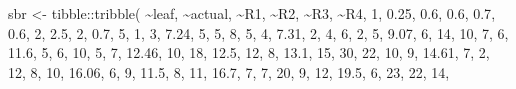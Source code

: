 \documentclass[
  letterpaper,
  DIV=11,
  numbers=noendperiod]{scrreprt}
\newenvironment{Shaded}{\begin{snugshade}}{\end{snugshade}}
\newcommand{\DecValTok}[1]{\textcolor[rgb]{0.68,0.00,0.00}{#1}}
\newcommand{\FloatTok}[1]{\textcolor[rgb]{0.68,0.00,0.00}{#1}}
\newcommand{\FunctionTok}[1]{\textcolor[rgb]{0.28,0.35,0.67}{#1}}
\newcommand{\NormalTok}[1]{\textcolor[rgb]{0.00,0.23,0.31}{#1}}
\newcommand{\OtherTok}[1]{\textcolor[rgb]{0.00,0.23,0.31}{#1}}
\newcommand{\SpecialCharTok}[1]{\textcolor[rgb]{0.37,0.37,0.37}{#1}}
\begin{document}
\begin{Shaded}
\begin{Highlighting}[]
\NormalTok{sbr }\OtherTok{\textless{}{-}}\NormalTok{ tibble}\SpecialCharTok{::}\FunctionTok{tribble}\NormalTok{(}
\SpecialCharTok{\textasciitilde{}}\NormalTok{leaf, }\SpecialCharTok{\textasciitilde{}}\NormalTok{actual, }\SpecialCharTok{\textasciitilde{}}\NormalTok{R1, }\SpecialCharTok{\textasciitilde{}}\NormalTok{R2,  }\SpecialCharTok{\textasciitilde{}}\NormalTok{R3, }\SpecialCharTok{\textasciitilde{}}\NormalTok{R4,}
\DecValTok{1}\NormalTok{,    }\FloatTok{0.25}\NormalTok{, }\FloatTok{0.6}\NormalTok{, }\FloatTok{0.6}\NormalTok{,  }\FloatTok{0.7}\NormalTok{, }\FloatTok{0.6}\NormalTok{,}
\DecValTok{2}\NormalTok{,     }\FloatTok{2.5}\NormalTok{,   }\DecValTok{2}\NormalTok{, }\FloatTok{0.7}\NormalTok{,    }\DecValTok{5}\NormalTok{,   }\DecValTok{1}\NormalTok{,}
\DecValTok{3}\NormalTok{,    }\FloatTok{7.24}\NormalTok{,   }\DecValTok{5}\NormalTok{,   }\DecValTok{5}\NormalTok{,    }\DecValTok{8}\NormalTok{,   }\DecValTok{5}\NormalTok{,}
\DecValTok{4}\NormalTok{,    }\FloatTok{7.31}\NormalTok{,   }\DecValTok{2}\NormalTok{,   }\DecValTok{4}\NormalTok{,    }\DecValTok{6}\NormalTok{,   }\DecValTok{2}\NormalTok{,}
\DecValTok{5}\NormalTok{,    }\FloatTok{9.07}\NormalTok{,   }\DecValTok{6}\NormalTok{,  }\DecValTok{14}\NormalTok{,   }\DecValTok{10}\NormalTok{,   }\DecValTok{7}\NormalTok{,}
\DecValTok{6}\NormalTok{,    }\FloatTok{11.6}\NormalTok{,   }\DecValTok{5}\NormalTok{,   }\DecValTok{6}\NormalTok{,   }\DecValTok{10}\NormalTok{,   }\DecValTok{5}\NormalTok{,}
\DecValTok{7}\NormalTok{,   }\FloatTok{12.46}\NormalTok{,  }\DecValTok{10}\NormalTok{,  }\DecValTok{18}\NormalTok{, }\FloatTok{12.5}\NormalTok{,  }\DecValTok{12}\NormalTok{,}
\DecValTok{8}\NormalTok{,    }\FloatTok{13.1}\NormalTok{,  }\DecValTok{15}\NormalTok{,  }\DecValTok{30}\NormalTok{,   }\DecValTok{22}\NormalTok{,  }\DecValTok{10}\NormalTok{,}
\DecValTok{9}\NormalTok{,   }\FloatTok{14.61}\NormalTok{,   }\DecValTok{7}\NormalTok{,   }\DecValTok{2}\NormalTok{,   }\DecValTok{12}\NormalTok{,   }\DecValTok{8}\NormalTok{,}
\DecValTok{10}\NormalTok{,  }\FloatTok{16.06}\NormalTok{,   }\DecValTok{6}\NormalTok{,   }\DecValTok{9}\NormalTok{, }\FloatTok{11.5}\NormalTok{,   }\DecValTok{8}\NormalTok{,}
\DecValTok{11}\NormalTok{,   }\FloatTok{16.7}\NormalTok{,   }\DecValTok{7}\NormalTok{,   }\DecValTok{7}\NormalTok{,   }\DecValTok{20}\NormalTok{,   }\DecValTok{9}\NormalTok{,}
\DecValTok{12}\NormalTok{,   }\FloatTok{19.5}\NormalTok{,   }\DecValTok{6}\NormalTok{,  }\DecValTok{23}\NormalTok{,   }\DecValTok{22}\NormalTok{,  }\DecValTok{14}\NormalTok{,}

\end{Highlighting}
\end{Shaded}
\end{document}
